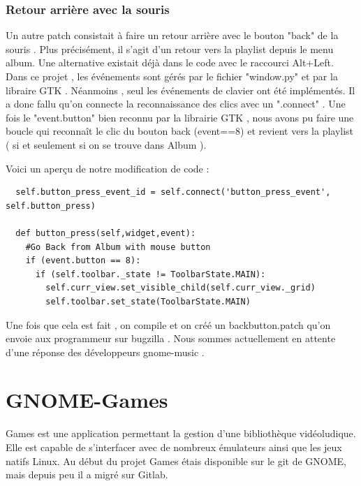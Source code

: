 \documentclass[12pt]{report}
\begin{document}
\subsection{Retour arrière avec la souris}
Un autre patch consistait à faire un retour arrière avec le bouton
"back" de la souris . Plus précisément, il s'agit d'un retour vers la
playlist depuis le menu album.  Une alternative existait déjà dans le
code avec le raccourci Alt+Left. Dans ce projet , les événements sont
gérés par le fichier "window.py" et par la libraire GTK . Néanmoins ,
seul les événements de clavier ont été implémentés. Il a donc fallu
qu'on connecte la reconnaissance des clics avec un ".connect" . Une
fois le "event.button" bien reconnu par la librairie GTK , nous avons
pu faire une boucle qui reconnaît le clic du bouton back (event==8) et
revient vers la playlist ( si et seulement si on se trouve dans Album
).

Voici un aperçu de notre modification de code : 

\begin{verbatim}
  self.button_press_event_id = self.connect('button_press_event', self.button_press)

  def button_press(self,widget,event):
    #Go Back from Album with mouse button 
    if (event.button == 8):
      if (self.toolbar._state != ToolbarState.MAIN):
        self.curr_view.set_visible_child(self.curr_view._grid)
        self.toolbar.set_state(ToolbarState.MAIN)
\end{verbatim}

Une fois que cela est fait , on compile et on créé un backbutton.patch
qu'on envoie aux programmeur sur bugzilla .  Nous sommes actuellement
en attente d'une réponse des développeurs gnome-music .

\newpage
\chapter{GNOME-Games} %
Games est une application permettant la gestion d'une
bibliothèque vidéoludique. Elle est capable de s'interfacer avec de
nombreux émulateurs ainsi que les jeux natifs Linux. Au début du
projet Games étais disponible sur le git de GNOME, mais depuis peu il
a migré sur Gitlab.
\end{document}
